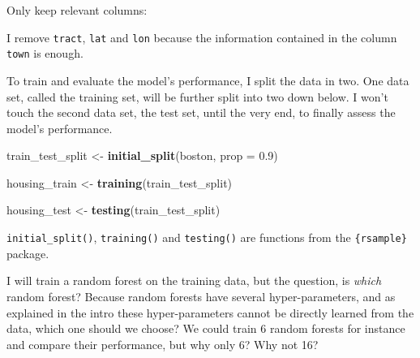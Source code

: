 \documentclass[]{gitbook}
\newenvironment{Shaded}{\begin{snugshade}}{\end{snugshade}}
\newcommand{\DataTypeTok}[1]{\textcolor[rgb]{0.13,0.29,0.53}{#1}}
\newcommand{\FloatTok}[1]{\textcolor[rgb]{0.00,0.00,0.81}{#1}}
\newcommand{\KeywordTok}[1]{\textcolor[rgb]{0.13,0.29,0.53}{\textbf{#1}}}
\newcommand{\NormalTok}[1]{#1}
\newcommand{\OperatorTok}[1]{\textcolor[rgb]{0.81,0.36,0.00}{\textbf{#1}}}
\newcommand{\StringTok}[1]{\textcolor[rgb]{0.31,0.60,0.02}{#1}}
\theoremstyle{definition}
\theoremstyle{definition}
\theoremstyle{definition}
\theoremstyle{remark}
\begin{document}
Only keep relevant columns:

\begin{Shaded}
\end{Shaded}

I remove \texttt{tract}, \texttt{lat} and \texttt{lon} because the
information contained in the column \texttt{town} is enough.

To train and evaluate the model's performance, I split the data in two.
One data set, called the training set, will be further split into two
down below. I won't touch the second data set, the test set, until the
very end, to finally assess the model's performance.

\begin{Shaded}
\begin{Highlighting}[]
\NormalTok{train_test_split <-}\StringTok{ }\KeywordTok{initial_split}\NormalTok{(boston, }\DataTypeTok{prop =} \FloatTok{0.9}\NormalTok{)}

\NormalTok{housing_train <-}\StringTok{ }\KeywordTok{training}\NormalTok{(train_test_split)}

\NormalTok{housing_test <-}\StringTok{ }\KeywordTok{testing}\NormalTok{(train_test_split)}
\end{Highlighting}
\end{Shaded}

\texttt{initial\_split()}, \texttt{training()} and \texttt{testing()}
are functions from the \texttt{\{rsample\}} package.

I will train a random forest on the training data, but the question, is
\emph{which} random forest? Because random forests have several
hyper-parameters, and as explained in the intro these hyper-parameters
cannot be directly learned from the data, which one should we choose? We
could train 6 random forests for instance and compare their performance,
but why only 6? Why not 16?
\end{document}
